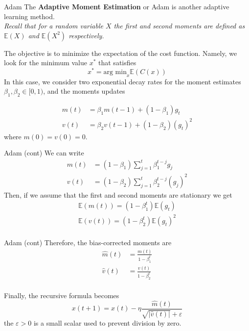 \documentclass{beamer}
\begin{document}
\begin{frame}{Adam}
	The \textbf{Adaptive Moment Estimation} or Adam is another adaptive learning method. \\
	
\textit{Recall that for a random variable $X$ the first and second moments are defined as $\mathbb{E}(X)$ and $\mathbb{E}(X^2)$ respectively.}
	

	
	
	The objective is to minimize the expectation of the cost function. Namely, we look for the minimum value $x^*$ that satisfies 
	\begin{equation*}
		x^*= \text{arg min}_x \mathbb{E}(C(x))
	\end{equation*}
	In this case, we consider two exponential decay rates for the moment estimates $\beta_1,\beta_2 \in [0,1)$, and the moments updates
	
	\begin{equation*}
		\begin{split}
			m(t)&= \beta_1 m(t-1) + (1-\beta_1)g_t \\
			v(t)&=\beta_2 v(t-1)+ (1-\beta_2)(g_t)^2
		\end{split}
	\end{equation*} 	
where $m(0)=v(0)=0$.  
\end{frame}

\begin{frame}{Adam (cont)}
	We can write
	\begin{equation*}
	\begin{split}
		m(t)&= (1-\beta_1) \sum_{j=1}^t \beta_1^{t-j} g_j \\
		v(t)&=(1-\beta_2) \sum_{j=1}^t \beta_2^{t-j} (g_j)^2 
	\end{split}
\end{equation*} 		
Then, if we assume that the first and second moments are stationary  we get 
\begin{equation*}
	\begin{split}
	\mathbb{E}(m(t))=(1-\beta_1^t) \mathbb{E}(g_t) \\
		\mathbb{E}(v(t))=(1-\beta_2^t) \mathbb{E}(g_t)^2 \\
	\end{split}
\end{equation*}

\end{frame}
\begin{frame}{Adam (cont)}
	Therefore, the bias-corrected moments are
	\begin{equation*}
		\begin{split}
			\widehat{m}(t)&= \frac{m(t)}{1-\beta_1^t} \\
			\widehat{v}(t)&=\frac{v(t)}{1-\beta_2^t} \\
		\end{split}
	\end{equation*}
	
	Finally, the recursive formula becomes
	\begin{equation*}
		x(t+1)= x(t)- \eta \frac{\widehat{m}(t)}{\sqrt{|\widehat{v}(t)|}+\varepsilon}
	\end{equation*}
	the $\varepsilon>0$ is a small scalar used to prevent division by zero. 
\end{frame}
\end{document}
